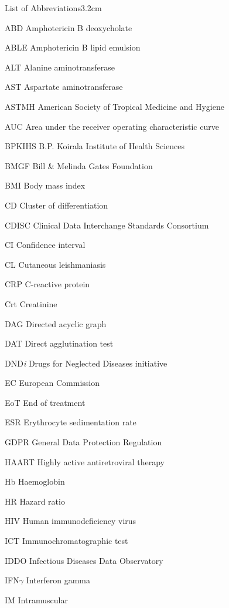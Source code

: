 \begin{mclistof}{List of Abbreviations}{3.2cm}
  \item[ABD] Amphotericin B deoxycholate
  \item[ABLE] Amphotericin B lipid emulsion
  \item[ALT] Alanine aminotransferase
  \item[AST] Aspartate aminotransferase
  \item[ASTMH] American Society of Tropical Medicine and Hygiene
  \item[AUC] Area under the receiver operating characteristic curve
  \item[BPKIHS] B.P. Koirala Institute of Health Sciences
  \item[BMGF] Bill \& Melinda Gates Foundation
  \item[BMI] Body mass index
  \item[CD] Cluster of differentiation
  \item[CDISC] Clinical Data Interchange Standards Consortium
  \item[CI] Confidence interval
  \item[CL] Cutaneous leishmaniasis
  \item[CRP] C-reactive protein
  \item[Crt] Creatinine
  \item[DAG] Directed acyclic graph
  \item[DAT] Direct agglutination test
  \item[DND\textit{i}] Drugs for Neglected Diseases initiative
  \item[EC] European Commission
  \item[EoT] End of treatment
  \item[ESR] Erythrocyte sedimentation rate
  \item[GDPR] General Data Protection Regulation
  \item[HAART] Highly active antiretroviral therapy
  \item[Hb] Haemoglobin
  \item[HR] Hazard ratio
  \item[HIV] Human immunodeficiency virus
  \item[ICT] Immunochromatographic test
  \item[IDDO] Infectious Diseases Data Observatory
  \item[IFN$\gamma$] Interferon gamma
  \item[IM] Intramuscular

\end{mclistof}
